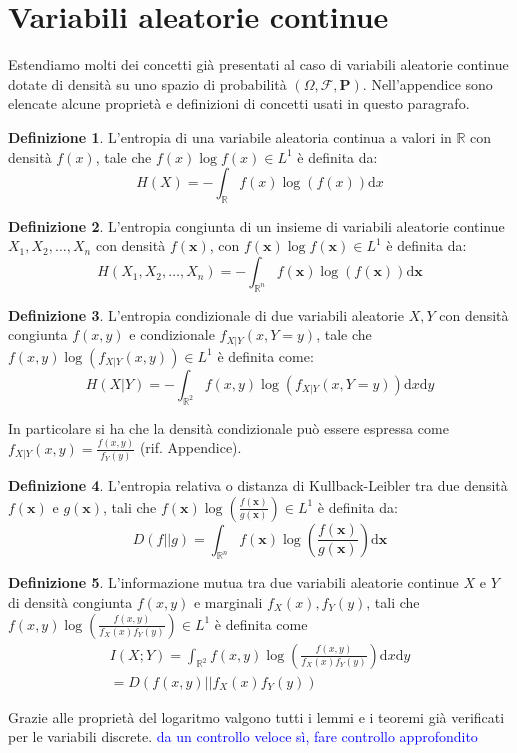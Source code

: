 \documentclass[a4paper,11pt]{book}
\theoremstyle{plain}
\theoremstyle{definition}
\newtheorem{defn}{Definizione}[chapter]
\theoremstyle{remark}
\newcommand{\R}{\mathbb{R}}
\newcommand{\dx}{\text{d}x}
\newcommand{\dy}{\text{d}y}
\newcommand{\dX}{\text{d}\bm{x}}
\newcommand{\x}{\bm{x}}
\begin{document}
\section{Variabili aleatorie continue}
Estendiamo molti dei concetti già presentati al caso di variabili aleatorie continue dotate di densità su uno spazio di probabilità $(\Omega, \mathcal{F}, \mathbf{P})$. Nell'appendice sono elencate alcune proprietà e definizioni di concetti usati in questo paragrafo.
\begin{defn}
	L'entropia di una variabile aleatoria continua a valori in $\R$ con densità $f(x)$, tale che $f(x)\log f(x)\in L^1$ è definita da:
	\begin{equation*}
		H(X) = -\int_{\R}{f(x)\log(f(x))\dx}
	\end{equation*}
\end{defn}
\begin{defn}
	L'entropia congiunta di un insieme di variabili aleatorie continue $X_1,X_2, \ldots, X_n$ con densità $f(\bm{x})$, con $f(\x)\log f(\x)\in L^1$ è definita da:
	\begin{equation*}
		H(X_1,X_2,\ldots,X_n)=-\int_{\R^n}{f(\bm{x})\log(f(\bm{x}))
		\dX}
	\end{equation*}
\end{defn}
\begin{defn}
	L'entropia condizionale di due variabili aleatorie $X,Y$ con densità congiunta $f(x,y)$ e condizionale $f_{X|Y}(x,Y = y)$, tale che $f(x,y)\log(f_{X|Y}(x,y))\in L^1$ è definita come:
	\begin{equation*}
		H(X|Y) = -\int_{\R^2}{f(x,y)\log(f_{X|Y}(x,Y = y))\dx\dy}
	\end{equation*}
\end{defn}
In particolare si ha che la densità condizionale può essere espressa come $f_{X|Y}(x,y) = \frac{f(x,y)}{f_Y(y)}$ (rif. Appendice).
\begin{defn}
	L'entropia relativa o distanza di Kullback-Leibler tra due densità $f(\x)$ e $g(\x)$, tali che $f(\x)\log\left(\frac{f(\x)}{g(\x)}\right)\in L^1$  è definita da:
	\begin{equation*}
		D(f||g) = \int_{\R^{n}}{f(\x)\log\left(\frac{f(\x)}{g(\x)}\right)\dX}
	\end{equation*}
\end{defn}
\begin{defn}
	L'informazione mutua tra due variabili aleatorie continue $X$ e $Y$ di densità congiunta $f(x,y)$ e marginali $f_X(x),f_Y(y)$, tali che $f(x,y)\log\left(\frac{f(x,y)}{f_X(x)f_Y(y)}\right)\in L^1$ è definita come
	\begin{align*}
		I(X;Y) = \int_{\R^2}{f(x,y)\log\left(\frac{f(x,y)}{f_X(x)f_Y(y)}\right)\dx\dy} \\
		= D(f(x,y)||f_X(x)f_Y(y))
	\end{align*}
\end{defn}
Grazie alle proprietà del logaritmo valgono tutti i lemmi e i teoremi già verificati per le variabili discrete. \textcolor{blue}{da un controllo veloce sì, fare controllo approfondito}
\end{document}
